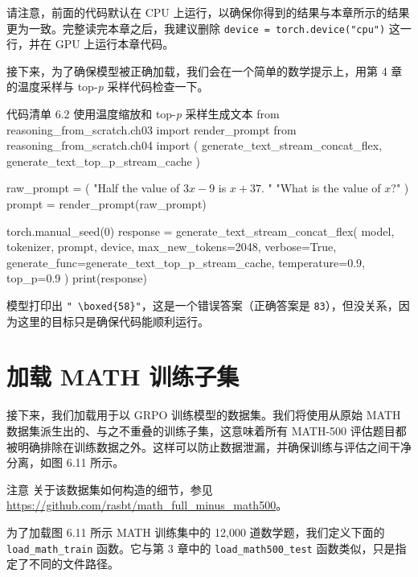 请注意，前面的代码默认在 CPU 上运行，以确保你得到的结果与本章所示的结果更为一致。完整读完本章之后，我建议删除 \texttt{device = torch.device(}\texttt{"}\texttt{cpu}\texttt{"}\texttt{)} 这一行，并在 GPU 上运行本章代码。

接下来，为了确保模型被正确加载，我们会在一个简单的数学提示上，用第 4 章的温度采样与 top-\emph{p} 采样代码检查一下。

\begin{codeboxt}{代码清单 6.2 使用温度缩放和 top-\emph{p} 采样生成文本}
from reasoning_from_scratch.ch03 import render_prompt
from reasoning_from_scratch.ch04 import (
    generate_text_stream_concat_flex,
    generate_text_top_p_stream_cache
)

raw_prompt = (
    "Half the value of $3x-9$ is $x+37$. "
    "What is the value of $x$?"
)
prompt = render_prompt(raw_prompt)

torch.manual_seed(0)
response = generate_text_stream_concat_flex(
    model, tokenizer, prompt, device,
    max_new_tokens=2048, verbose=True,
    generate_func=generate_text_top_p_stream_cache,
    temperature=0.9,
    top_p=0.9
)
print(response)
\end{codeboxt}

模型打印出 \texttt{"}\texttt{ \textbackslash boxed\{58\}}\texttt{"}，这是一个错误答案（正确答案是 \texttt{83}），但没关系，因为这里的目标只是确保代码能顺利运行。

\section{加载 MATH 训练子集}

接下来，我们加载用于以 GRPO 训练模型的数据集。我们将使用从原始 MATH 数据集派生出的、与之不重叠的训练子集，这意味着所有 MATH-500 评估题目都被明确排除在训练数据之外。这样可以防止数据泄漏，并确保训练与评估之间干净分离，如图 6.11 所示。

\begin{myWarning}{注意}
 关于该数据集如何构造的细节，参见 \href{https://github.com/rasbt/math\_full\_minus\_math500}{https://github.com/rasbt/math\_full\_minus\_math500}。\end{myWarning}


为了加载图 6.11 所示 MATH 训练集中的 12,000 道数学题，我们定义下面的 \texttt{load\_math\_train} 函数。它与第 3 章中的 \texttt{load\_math500\_test} 函数类似，只是指定了不同的文件路径。

